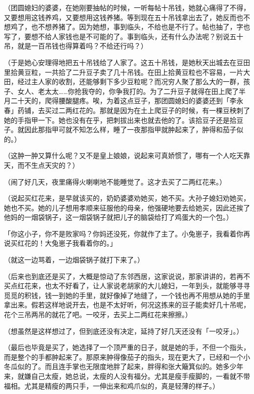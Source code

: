 \documentclass[UTF8]{ctexart}
\begin{document}
（团圆媳妇的婆婆，在她刚要抽帖的时候，一听每帖十吊钱，她就心痛得了不得，又要想用这钱养鸡，又要想用这钱养猪。等到现在五十吊钱拿出去了，她反而也不想鸡了，也不想养猪了。因为她想，事到临头，不给也是不行了。帖也抽了，字也写了，要想不给人家钱也是不可能的了。事到临头，还有什么办法呢？别说五十吊，就是一百吊钱也得算着吗？不给还行吗？）

（于是她心安理得地把五十吊钱给了人家了。这五十吊钱，是她秋天出城去在豆田里拾黄豆粒，一共拾了二升豆子卖了几十吊钱。在田上拾黄豆粒也不容易，一片大田，经过主人家的收割，还能够剩下多少豆粒呢？而况穷人聚了那么大的一群，孩子、女人、老太太……你抢我夺的，你争我打的。为了二升豆子就得在田上爬了半月二十天的，爬得腰酸腿疼。唉，为着这点豆子，那团圆媳妇的婆婆还到「李永春」药铺，去买过二两红花的。那就是因为在土上爬豆子的时候，有一棵豆秧刺了她的手指甲一下。她也没有在乎，把刺拔出来也就去他的了。该拾豆子还是拾豆子。就因此那指甲可就不知怎么样，睡了一夜那指甲就肿起来了，肿得和茄子似的。）

（这肿一肿又算什么呢？又不是皇上娘娘，说起来可真娇惯了，哪有一个人吃天靠天，而不生点天灾的？）

（闹了好几天，夜里痛得火喇喇地不能睡觉了。这才去买了二两红花来。）

（说起买红花来，是早就该买的，奶奶婆婆劝她买，她不买。大孙子媳妇劝她买，她也不买。她的儿子想用孝顺来征服他的母亲，他强硬地要去给她买，因此还挨了他妈的一烟袋锅子，这一烟袋锅子就把儿子的脑袋给打了鸡蛋大的一个包。）

「你这小子，你不是败家吗？你妈还没死，你就作了主了。小兔崽子，我看着你再说买红花的！大兔崽子我看着你的。」

（就这一边骂着，一边烟袋锅子就打下来了。）

（后来也到底还是买了，大概是惊动了东邻西居，这家说说，那家讲讲的，若再不买点红花来，也太不好看了，让人家说老胡家的大儿媳妇，一年到头，就能够寻寻觅觅的积钱，钱一到她的手里，就好像掉了地缝了，一个钱也再不用想从她的手里拿出来。假若这样地说开去，也是不太好听，何况这拣来的豆子能卖好几十吊呢，花个三吊两吊的就花了吧。一咬牙，去买上二两红花来擦擦。）

（想虽然是这样想过了，但到底还没有决定，延持了好几天还没有「一咬牙」。）

（最后也毕竟是买了，她选择了一个顶严重的日子，就是她的手，不但一个指头，而是整个的手都肿起来了。那原来肿得像茄子的指头，现在更大了，已经和一个小冬瓜似的了。而且连手掌也无限度地胖了起来，胖得和张大簸箕似的。她多少年来，就嫌自己太瘦，她总说，太瘦的人没有福分。尤其是瘦手瘦脚的，一看就不带福相。尤其是精瘦的两只手，一伸出来和鸡爪似的，真是轻薄的样子。）
\end{document}
